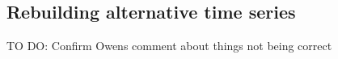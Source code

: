 \documentclass[11pt,
  english,
  a4paper,
]{article}
\begin{document}
\clearpage


\hypertarget{rebuilding-alternative-time-series}{%
\subsection{Rebuilding alternative time series}\label{rebuilding-alternative-time-series}}

\leavevmode\tagmcend\tagstructend


TO DO: Confirm Owens comment about things not being correct

\leavevmode\tagmcend\tagstructend\par

\begingroup\fontsize{10}{12}\selectfont
\begingroup\fontsize{10}{12}\selectfont
\end{document}
